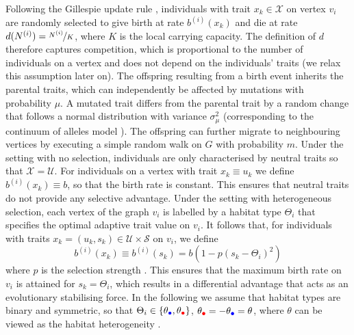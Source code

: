   Following the Gillespie update rule \cite{Gillespie1976}, individuals with trait $x_k \in \mathcal{X}$ on vertex $v_i$ are randomly selected to give birth at rate $b^{(i)}(x_k)$ and die at rate $d(N^{(i)}) = \nicefrac{N^{(i)}}{K}$, where $K$ is the local carrying capacity. 
  The definition of $d$ therefore captures competition, which is proportional to the number of individuals on a vertex and does not depend on the individuals' traits (we relax this assumption later on).
  The offspring resulting from a birth event inherits the parental traits, which can independently be affected by mutations with probability $\mu$. A mutated trait differs from the parental trait by a random change that follows a normal distribution with variance $\sigma_\mu^2$ (corresponding to the continuum of alleles model \cite{Kimura1964}). The offspring can further migrate to neighbouring vertices by executing a simple random walk on $G$ with probability $m$.
  Under the setting with no selection, individuals are only characterised by neutral traits so that $\mathcal{X} = \mathcal{U}$.
  For individuals on a vertex with trait $x_k\equiv u_k$ we define $b^{(i)}(x_k) \equiv b$, so that the birth rate is constant. This ensures that neutral traits do not provide any selective advantage.
  Under the setting with heterogeneous selection, each vertex of the graph $v_i$ is labelled by a habitat type $\Theta_i$ that specifies the optimal adaptive trait value on $v_i$. It follows that, for individuals with traits $x_k = (u_k,s_k) \in \mathcal{U}\times \mathcal{S}$ on $v_i$, we define 
  \begin{equation} \label{eq:birth_fun}
   b^{(i)}(x_k) \equiv b^{(i)}(s_k) = b(1 - p(s_k - \Theta_i)^2)
  \end{equation}
  where $p$ is the selection strength \cite{Mirrahimi2020}. This ensures that the maximum birth rate on $v_i$ is attained for $s_k = \Theta_i$, which results in a differential advantage that acts as an evolutionary stabilising force. In the following we assume that habitat types are binary and symmetric, so that $\Theta_i \in \{\theta_{\bcirc},\theta_{\rcirc}\}$, $\theta_{\rcirc} = -\theta_{\bcirc} = \theta$, where $\theta$ can be viewed as the habitat heterogeneity \cite{Mirrahimi2020}. 
  
